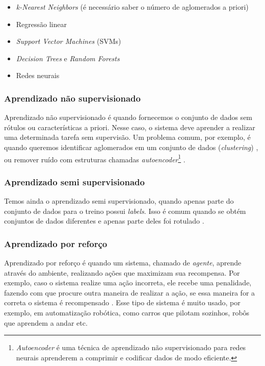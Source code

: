 \documentclass[a4paper,12pt,oneside]{book}
\begin{document}
\begin{itemize}
    \item \textit{k-Nearest Neighbors} (é necessário saber o número de aglomerados a priori) \cite{knn}
    \item Regressão linear
    \item \textit{Support Vector Machines} (SVMs)
    \item \textit{Decision Trees} e \textit{Random Forests}
    \item Redes neurais
\end{itemize}

\subsubsection*{Aprendizado não supervisionado}

\par Aprendizado não supervisionado é quando fornecemos o conjunto de dados sem rótulos ou características a priori. Nesse caso, o sistema deve aprender a realizar uma determinada tarefa sem supervisão. Um problema comum, por exemplo, é quando queremos identificar aglomerados em um conjunto de dados (\textit{clustering}) \cite{unsupervised, knn_uns}, ou remover ruído com estruturas chamadas \textit{autoencoder}\footnote[1]{\textit{Autoencoder} é uma técnica de aprendizado não supervisionado para redes neurais aprenderem a comprimir e codificar dados de modo eficiente.} \cite{8621080}.

\subsubsection*{Aprendizado semi supervisionado}

\par Temos ainda o aprendizado semi supervisionado, quando apenas parte do conjunto de dados para o treino possui \textit{labels}. Isso é comum quando se obtém conjuntos de dados diferentes e apenas parte deles foi rotulado \cite{semi_supervised}.

\subsubsection*{Aprendizado por reforço}

\par Aprendizado por reforço é quando um sistema, chamado de \textit{agente}, aprende através do ambiente, realizando ações que maximizam sua recompensa. Por exemplo, caso o sistema realize uma ação incorreta, ele recebe uma penalidade, fazendo com que procure outra maneira de realizar a ação, se essa maneira for a correta o sistema é recompensado \cite{reinforcement}. Esse tipo de sistema é muito usado, por exemplo, em automatização robótica, como carros que pilotam sozinhos, robôs que aprendem a andar etc. \cite{robot_ml}
\end{document}
